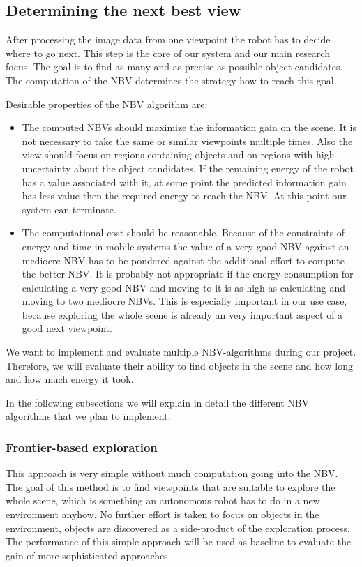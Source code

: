 \documentclass[a4paper,11pt,english]{article}
\begin{document}
\subsection{Determining the next best view}
\label{system:nbv}
After processing the image data from one viewpoint the robot has to decide where to go next.
This step is the core of our system and our main research focus.
The goal is to find as many and as precise as possible object candidates.
The computation of the NBV determines the strategy how to reach this goal.

Desirable properties of the NBV algorithm are:
\begin{itemize}
	\item The computed NBVs should maximize the information gain on the scene. It is not necessary to take the same or similar viewpoints multiple times. Also the view should focus on regions containing objects and on regions with high uncertainty about the object candidates. If the remaining energy of the robot has a value associated with it, at some point the predicted information gain has less value then the required energy to reach the NBV. At this point our system can terminate.
	\item The computational cost should be reasonable. Because of the constraints of energy and time in mobile systems the value of a very good NBV against an mediocre NBV has to be pondered against the additional effort to compute the better NBV. It is probably not appropriate if the energy consumption for calculating a very good NBV and moving to it is as high as calculating and moving to two mediocre NBVs. This is especially important in our use case, because exploring the whole scene is already an very important aspect of a good next viewpoint.
\end{itemize}

We want to implement and evaluate multiple NBV-algorithms during our project.
Therefore, we will evaluate their ability to find objects in the scene and how long and how much energy it took.

In the following subsections we will explain in detail the different NBV algorithms that we plan to implement.

\subsubsection{Frontier-based exploration}
This approach is very simple without much computation going into the NBV.
The goal of this method is to find viewpoints that are suitable to explore the whole scene, which is something an autonomous robot has to do in a new environment anyhow.
No further effort is taken to focus on objects in the environment, objects are discovered as a side-product of the exploration process.
The performance of this simple approach will be used as baseline to evaluate the gain of more sophisticated approaches.
\end{document}
